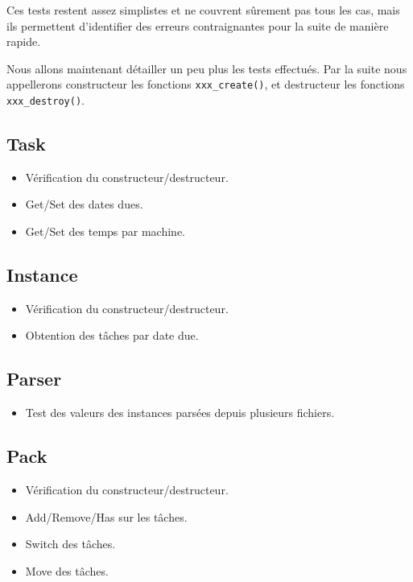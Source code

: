 \documentclass[hideweeklyreports]{polytech/polytech}
\newcommand{\codec}[1]{\texttt{#1}}
\begin{document}
			Ces tests restent assez simplistes et ne couvrent sûrement pas tous les cas, mais ils permettent d'identifier des erreurs contraignantes pour la suite de manière rapide.
			
			Nous allons maintenant détailler un peu plus les tests effectués. Par la suite nous appellerons constructeur les fonctions \codec{xxx\_create()}, et destructeur les fonctions \codec{xxx\_destroy()}.
			\subsection{Task}
				\begin{itemize}
					\item Vérification du constructeur/destructeur.
					\item Get/Set des dates dues.
					\item Get/Set des temps par machine.
				\end{itemize}
				
			\subsection{Instance}
				\begin{itemize}
					\item Vérification du constructeur/destructeur.
					\item Obtention des tâches par date due.
				\end{itemize}
				
			\subsection{Parser}
				\begin{itemize}
					\item Test des valeurs des instances parsées depuis plusieurs fichiers.
				\end{itemize}
				
			\subsection{Pack}
				\begin{itemize}
					\item Vérification du constructeur/destructeur.
					\item Add/Remove/Has sur les tâches.
					\item Switch des tâches.
					\item Move des tâches.
				\end{itemize}
				
\end{document}
